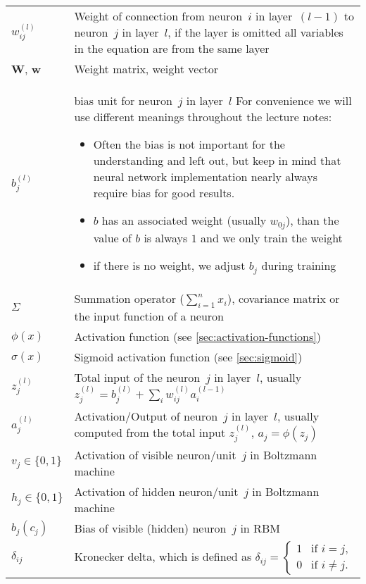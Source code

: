 \begin{tabularx}{\textwidth}{ l X }
\midrule %
$w_{ij}^{(l)}$	& Weight of connection from neuron~$i$ in layer~$(l-1)$ to neuron~$j$ in layer~$l$, if the layer is omitted all variables in the equation are from the same layer \\
$\mathbf{W}$, $\mathbf{w}$ & Weight matrix, weight vector \\
$b_j^{(l)}$	& bias unit for neuron~$j$ in layer~$l$ \newline For convenience we will use different meanings throughout the lecture notes:
				\begin{itemize}
				\item Often the bias is not important for the understanding and left out, but keep in mind that neural network implementation nearly always require bias for good results.
				\item $b$ has an associated weight (usually $w_{0j}$), than the value of $b$ is always $1$ and we only train the weight
				\item if there is no weight, we adjust $b_j$ during training
				\end{itemize} \\
$\Sigma$		& Summation operator (\eg $\sum_{i=1}^n x_i$), covariance matrix or the input function of a neuron \\
$\phi(x)$		& Activation function (see \cref{sec:activation-functions}) \\
$\sigma(x)$		& Sigmoid activation function (see \cref{sec:sigmoid}) \\
$z_j^{(l)}$		& Total input of the neuron~$j$ in layer~$l$, usually $z_j^{(l)} = b_j^{(l)} + \sum_i w_{ij}^{(l)} a_i^{(l-1)}$ \\
$a_j^{(l)}$		& Activation/Output of neuron~$j$ in layer~$l$, usually computed from the total input $z_j^{(l)}$, $a_j=\phi(z_j)$ \\

\midrule %
$v_j \in \{0,1\}$ & Activation of visible neuron/unit~$j$ in Boltzmann machine \\
$h_j \in \{0,1\}$ & Activation of hidden neuron/unit~$j$ in Boltzmann machine \\
$b_j (c_j)$		& Bias of visible (hidden) neuron~$j$ in \gls{RBM} \\

\midrule %
$\delta_{ij}$	&  Kronecker delta, which is defined as $\delta_{ij}=\begin{cases}1 &\text{if } i = j,\\0 &\text{if } i \neq j.\end{cases}$
\end{tabularx}